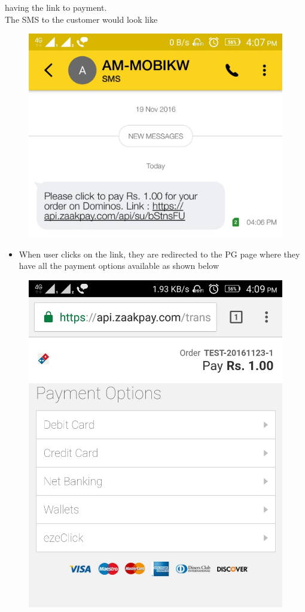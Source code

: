 \documentclass{article}
\begin{document}
having the link to payment.
\\ The SMS to the customer would look like 
\begin{figure}[H]
\centering
\includegraphics[scale=0.3]{Screenshot_2016-11-23-16-07-57-015.jpg}
\end{figure}
\newpage
\begin{itemize}
\item When user clicks on the link, they are redirected to the PG page where they have all the payment options available as shown below
\end{itemize}
\begin{figure}[H]
\centering
\includegraphics[scale=0.16]{Screenshot_2016-11-23-16-09-06-454.jpg}
\end{figure}
\end{document}
